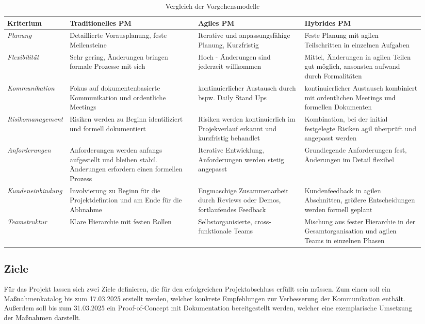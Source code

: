 \documentclass[ThesisDJ.tex]{subfiles}
\begin{document}
  \begin{table}
    \begin{tabular}{|p{4cm}|p{4cm}|p{4cm}|p{4cm}|}
      \hline 
      Kriterium & Traditionelles PM & Agiles PM & Hybrides PM \\
      \hline
      \emph{Planung} & Detaillierte Vorausplanung, feste Meilensteine & Iterative und anpassungsfähige Planung, Kurzfristig & Feste Planung mit agilen Teilschritten in einzelnen Aufgaben\\
      \hline
      \emph{Flexibilität} & Sehr gering, Änderungen bringen formale Prozesse mit sich & Hoch - Änderungen sind jederzeit willkommen & Mittel, Änderungen in agilen Teilen gut möglich, ansonsten aufwand durch Formalitäten \\
      \hline
      \emph{Kommunikation} & Fokus auf dokumentenbasierte Kommunikation und ordentliche Meetings & kontinuierlicher Austausch durch bspw. Daily Stand Ups & kontinuierlicher Austausch kombiniert mit ordentlichen Meetings und formellen Dokumenten \\
      \hline
      \emph{Risikomanagement} & Risiken werden zu Beginn identifiziert und formell dokumentiert & Risiken werden kontinuierlich im Projekverlauf erkannt und kurzfristig behandlet & Kombination, bei der initial festgelegte Risiken agil überprüft und angepasst werden\\
      \hline
      \emph{Anforderungen} & Anforderungen werden anfangs aufgestellt und bleiben stabil. Änderungen erfordern einen formellen Prozess & Iterative Entwicklung, Anforderungen werden stetig angepasst & Grundlegende Anforderungen fest, Änderungen im Detail flexibel \\
      \hline
      \emph{Kundeneinbindung} & Involvierung zu Beginn für die Projektdefintion und am Ende für die Abhnahme & Engmaschige Zusammenarbeit durch Reviews oder Demos, fortlaufendes Feedback & Kundenfeedback in agilen Abschnitten, größere Entscheidungen werden formell geplant \\ 
      \hline
      \emph{Teamstruktur} & Klare Hierarchie mit festen Rollen & Selbstorganisierte, cross-funktionale Teams & Mischung aus fester Hierarchie in der Gesamtorganisation und agilen Teams in einzelnen Phasen \\
      \hline
    \end{tabular}
    \caption{Vergleich der Vorgehensmodelle}
    \label{tab:methods}
  \end{table}
	
	\subsection{Ziele}
  Für das Projekt lassen sich zwei Ziele definieren, die für den erfolgreichen Projektabschluss erfüllt sein müssen.
  Zum einen soll ein Maßnahmenkatalog bis zum 17.03.2025 erstellt werden, welcher konkrete Empfehlungen zur Verbesserung der Kommunikation
  enthält. Außerdem soll bis zum 31.03.2025 ein Proof-of-Concept mit Dokumentation bereitgestellt werden, welcher eine exemplarische Umsetzung
  der Maßnahmen darstellt. 
\end{document}
